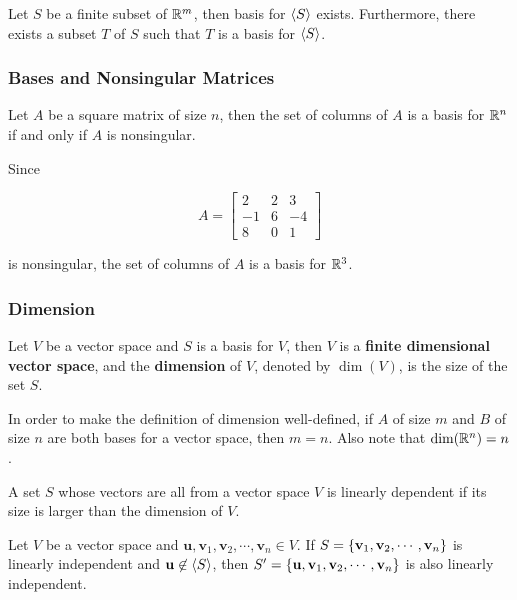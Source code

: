 \documentclass[a4paper,12pt]{article}
\begin{document}
\begin{thm}
  Let $S$ be a finite subset of $\mathbb{R}^{m}$, then basis for $\left\langle S\right\rangle$ exists. Furthermore, there exists a subset $T$ of $S$ such that $T$ is a basis for $\left\langle S\right\rangle$.
\end{thm}

\subsubsection{Bases and Nonsingular Matrices}
\begin{thm}
  Let $A$ be a square matrix of size $n$, then the set of columns of $A$ is a basis for $\mathbb{R}^{n}$ if and only if $A$ is nonsingular.
\end{thm}\n

\begin{exm}
  Since

  $$A=\begin{bmatrix}
    2 & 2 & 3\\
    -1 & 6 & -4\\
    8 & 0 & 1
  \end{bmatrix}$$\s

  is nonsingular, the set of columns of $A$ is a basis for $\mathbb{R}^{3}$.
\end{exm}

\subsubsection{Dimension}
\begin{dft}
  Let $V$ be a vector space and $S$ is a basis for $V$, then $V$ is a \textbf{finite dimensional vector space}, and the \textbf{dimension} of $V$, denoted by $\dim(V)$, is the size of the set $S$.
\end{dft}\n

In order to make the definition of dimension well-defined, if $A$ of size $m$ and $B$ of size $n$ are both bases for a vector space, then $m=n$. Also note that $\dim(\mathbb{R}^{n})=n$.\n

\begin{thm}
  A set $S$ whose vectors are all from a vector space $V$ is linearly dependent if its size is larger than the dimension of $V$.
\end{thm}\n

\begin{pst}
  Let $V$ be a vector space and $\mathbf{u},\mathbf{v}_{1},\mathbf{v}_{2},\cdots,\mathbf{v}_{n}\in V$. If $S=\left\{ \mathbf{v}_{1},\mathbf{v}_{2},\cdots,\mathbf{v}_{n}\right\}$ is linearly independent and $\mathbf{u}\not\in\left\langle S\right\rangle$, then $S'=\left\{ \mathbf{u},\mathbf{v}_{1},\mathbf{v}_{2},\cdots,\mathbf{v}_{n}\right\}$ is also linearly independent.
\end{pst}\n
\end{document}
